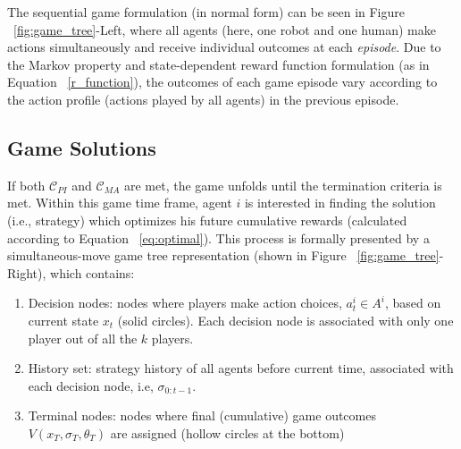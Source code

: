 \documentclass[letterpaper, 10 pt, conference]{ieeeconf}  %
\begin{document}
The sequential game formulation (in normal form) can be seen in Figure 
~\ref{fig:game_tree}-Left, where all agents (here, one robot and one 
human) make actions simultaneously and receive individual outcomes at each 
\textit{episode}. Due to the 
Markov property and state-dependent reward function formulation (as in 
Equation ~\ref{r_function}), the outcomes of each game episode vary according 
to the action profile (actions played by all agents) in the previous episode.

\subsection{Game Solutions}
If both $\mathcal{C}_{PI}$ and $\mathcal{C}_{MA}$ are met, the game unfolds 
until the termination criteria is met. Within this game 
time frame, agent $i$ is interested in finding the solution (i.e., strategy) 
which optimizes his future cumulative rewards (calculated according to Equation 
~\ref{eq:optimal}). This process is formally presented by a
simultaneous-move game tree representation (shown in Figure 
~\ref{fig:game_tree}-Right), which contains:
\begin{enumerate}
  \item Decision nodes: nodes where players make action choices, 
    $a^i_t \in A^i$, based on current state $x_t$ (solid circles). Each decision node is associated with only one player out of all the $k$ players.
  \item History set: strategy history of all agents before current time, associated with each decision node, i.e,  $\sigma_{0:t-1}$. 
  \item Terminal nodes: nodes where final (cumulative) game outcomes 
    $V(x_T,\sigma_T,\theta_T)$ are assigned (hollow circles at the bottom)
\end{enumerate}
\end{document}
